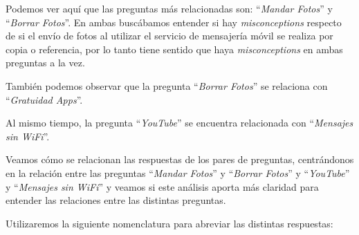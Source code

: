 Podemos ver aquí que las preguntas más relacionadas son: ``\textit{Mandar Fotos}'' y ``\textit{Borrar Fotos}''. En ambas buscábamos entender si hay \textit{misconceptions} respecto de si el envío de fotos al utilizar el servicio de mensajería móvil se realiza por copia o referencia, por lo tanto tiene sentido que haya \textit{misconceptions} en ambas preguntas a la vez.

También podemos observar que la pregunta ``\textit{Borrar Fotos}'' se relaciona con ``\textit{Gratuidad Apps}''.

Al mismo tiempo, la pregunta ``\textit{YouTube}'' se encuentra relacionada con ``\textit{Mensajes sin WiFi}''. 

Veamos cómo se relacionan las respuestas de los pares de preguntas, centrándonos en la relación entre las preguntas ``\textit{Mandar Fotos}'' y ``\textit{Borrar Fotos}'' y  ``\textit{YouTube}'' y ``\textit{Mensajes sin WiFi}'' y veamos si este análisis aporta más claridad para entender las relaciones entre las distintas preguntas.

Utilizaremos la siguiente nomenclatura para abreviar las distintas respuestas:

